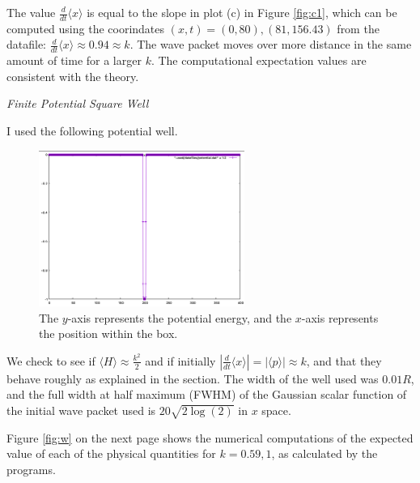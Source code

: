 \documentclass[letterpaper,12pt]{article}
\begin{document}
    The value $\frac{d}{dt} \langle x \rangle$ is equal to the slope in plot (c)
    in Figure
    \ref{fig:c1}, which can be computed using the coorindates $(x, t)
    = (0, 80), (81, 156.43)$ from the datafile: $\frac{d}{dt} \langle x \rangle
    \approx 0.94 \approx k$. The wave packet moves over more distance in the
    same amount of time for a larger $k$. The computational expectation values
    are consistent with the theory.

    \pagebreak

    \begin{center}
        \textit{Finite Potential Square Well}
    \end{center}

    I used the following potential well.

    \begin{figure}[H]
        \centering
        \includegraphics[width=0.6\textwidth]{smallwell.png}
        \caption[Small Potential Well]{The $y$-axis represents the potential
        energy, and the $x$-axis represents the position within the box.}
        \label{fig:smallwell}
    \end{figure}

    We check to see if $\langle H \rangle \approx \frac{k^2}{2}$ and if
    initially $\left|
    \frac{d}{dt} \langle x \rangle \right| = \left| \langle p \rangle \right|
    \approx k$, and that they behave roughly as explained in the
     section. The width of the well used was $0.01R$, and
    the full width at half maximum (FWHM) of the Gaussian scalar function of the
    initial wave packet used is $20\sqrt{2\log(2)}$ in $x$ space.

    Figure \ref{fig:w} on the next page shows the numerical computations of the
    expected value of each of the physical quantities for $k = 0.59, 1$, as
    calculated by the programs.
\end{document}
